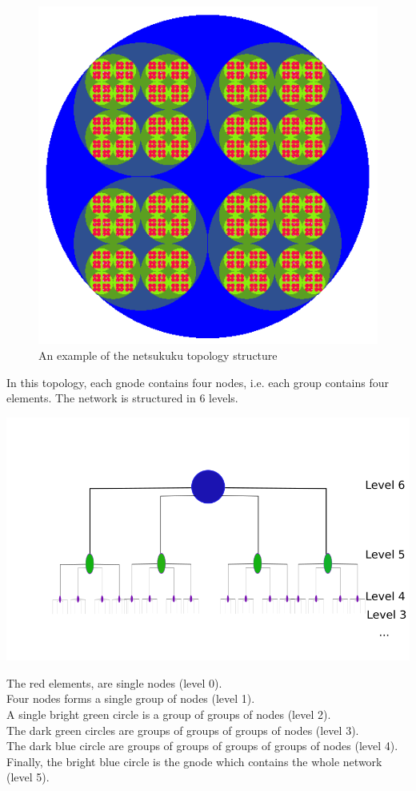 \documentclass[a4paper]{article}
\begin{document}
\begin{figure}[h]
	\begin{center}
		\includegraphics[scale=0.5]{fig/fractal_circle}
	\end{center}
	\caption{An example of the netsukuku topology structure}
	\label{fig:fract_circle}
\end{figure}

In this topology, each gnode contains four nodes, i.e. each group contains
four elements. The network is structured in 6 levels.
\begin{center}
	\includegraphics[scale=0.9]{fig/sample-topology-tree}
\end{center}
The red elements, are single nodes (level 0).\\
Four nodes forms a single group of nodes (level 1).\\
A single bright green circle is a 
				  group of groups of nodes (level 2).\\
The dark green circles are        groups of groups of groups of nodes (level 3).\\
The dark blue circle are          groups of groups of groups of groups of
nodes (level 4). \\
Finally, the bright blue circle is the gnode which contains the whole network
(level 5).
\end{document}
